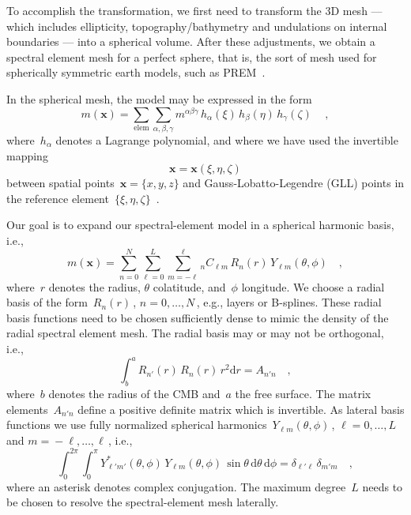 \documentclass[extra,mreferee]{gji}
\begin{document}
To accomplish the transformation,
we first need to transform the 3D mesh --- which includes ellipticity, topography/bathymetry and undulations on internal boundaries --- into a spherical volume.
After these adjustments, we obtain a spectral element mesh for a perfect sphere,
that is, the sort of mesh used for spherically symmetric earth models, such as PREM~\citep{PREM}.

In the spherical mesh, the model may be expressed in the form
\begin{equation}
    m(\mathbf{x})=\sum_{\mathrm{elem}}\sum_{\alpha,\beta,\gamma}m^{\alpha\beta\gamma}\,h_{\alpha}(\xi)\,h_{\beta}(\eta)\,h_{\gamma}(\zeta)\,
    \quad ,
\end{equation}
where~$h_\alpha$ denotes a Lagrange polynomial, and where we have used the invertible mapping
\begin{equation}
    \mathbf{x}=\mathbf{x}(\xi,\eta,\zeta)
    \label{eq:map}
\end{equation}
between spatial points~$\mathbf{x}=\{x,y,z\}$ and Gauss-Lobatto-Legendre (GLL) points in the reference element~$\{\xi,\eta,\zeta\}$~\citep{KoTr99}.

Our goal is to expand our spectral-element model in a spherical harmonic basis, i.e.,
\begin{equation}
    m(\mathbf{x})=\sum_{n=0}^N\sum_{\ell = 0}^L\sum_{m=-\ell}^\ell {}_nC_{\ell m}\,R_n(r)\,Y_{\ell m}(\theta,\phi)
    \quad ,
    \label{eq:m}
\end{equation}
where~$r$ denotes the radius, $\theta$ colatitude, and~$\phi$ longitude.
We choose a radial basis of the form~$R_n(r)$\,, $n=0,\ldots,N$\,,
e.g., layers or B-splines.
These radial basis functions need to be chosen sufficiently dense to mimic the density of the radial spectral element mesh.
The radial basis may or may not be orthogonal,
i.e.,
\begin{equation}
    \int_b^a R_{n'}(r)\,R_{n}(r)\,r^2\mathrm{d}r = A_{n'n}
    \quad ,
    \label{eq:R}
\end{equation}
where~$b$ denotes the radius of the CMB and~$a$ the free surface.
The matrix elements~$A_{n'n}$ define a positive definite matrix which is invertible.
As lateral basis functions we use fully normalized spherical harmonics~$Y_{\ell m}(\theta,\phi)$\,, $\ell=0,\ldots,L$ and $m=\mbox{}-\ell,\ldots,\ell$\,, i.e.,~\citep{DT98}
\begin{equation}
    \int_0^{2\pi}\int_0^\pi Y^*_{\ell'm'}(\theta,\phi)\,Y_{\ell m}(\theta,\phi)\,\sin\theta\,\mathrm{d}\theta\,\mathrm{d}\phi = \delta_{\ell' \ell}\,\delta_{m'm}
    \quad ,
    \label{eq:Y}
\end{equation}
where an asterisk denotes complex conjugation.
The maximum degree~$L$ needs to be chosen to resolve the spectral-element mesh laterally.
\end{document}
